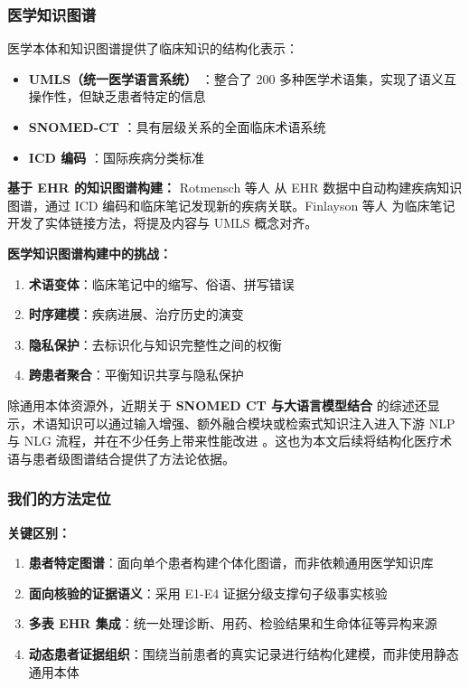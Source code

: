 \documentclass[11pt]{article}
\begin{document}
\subsubsection{医学知识图谱}

医学本体和知识图谱提供了临床知识的结构化表示：

\begin{itemize}
\item
  \textbf{UMLS（统一医学语言系统）} \citep{bodenreider2004umls}：整合了 200 多种医学术语集，实现了语义互操作性，但缺乏患者特定的信息
\item
  \textbf{SNOMED-CT} \citep{donnelly2006snomedCt}：具有层级关系的全面临床术语系统
\item
  \textbf{ICD 编码} \citep{who2016icd10}：国际疾病分类标准
\end{itemize}

\textbf{基于 EHR 的知识图谱构建：} Rotmensch 等人 \citep{rotmensch2017healthKnowledgeGraph} 从 EHR 数据中自动构建疾病知识图谱，通过 ICD 编码和临床笔记发现新的疾病关联。Finlayson 等人 \citep{finlayson2014graphMedicine} 为临床笔记开发了实体链接方法，将提及内容与 UMLS 概念对齐。

\textbf{医学知识图谱构建中的挑战：}

\begin{enumerate}
\def\labelenumi{\arabic{enumi}.}
\item
  \textbf{术语变体}：临床笔记中的缩写、俗语、拼写错误
\item
  \textbf{时序建模}：疾病进展、治疗历史的演变
\item
  \textbf{隐私保护}：去标识化与知识完整性之间的权衡
\item
  \textbf{跨患者聚合}：平衡知识共享与隐私保护
\end{enumerate}

除通用本体资源外，近期关于 \textbf{SNOMED CT 与大语言模型结合} 的综述还显示，术语知识可以通过输入增强、额外融合模块或检索式知识注入进入下游 NLP 与 NLG 流程，并在不少任务上带来性能改进 \citep{chang2024snomedCtLLM}。这也为本文后续将结构化医疗术语与患者级图谱结合提供了方法论依据。

\subsubsection{我们的方法定位}

\textbf{关键区别：}

\begin{enumerate}
\def\labelenumi{\arabic{enumi}.}
\item
  \textbf{患者特定图谱}：面向单个患者构建个体化图谱，而非依赖通用医学知识库
\item
  \textbf{面向核验的证据语义}：采用 E1-E4 证据分级支撑句子级事实核验
\item
  \textbf{多表 EHR 集成}：统一处理诊断、用药、检验结果和生命体征等异构来源
\item
  \textbf{动态患者证据组织}：围绕当前患者的真实记录进行结构化建模，而非使用静态通用本体
\end{enumerate}
\end{document}
